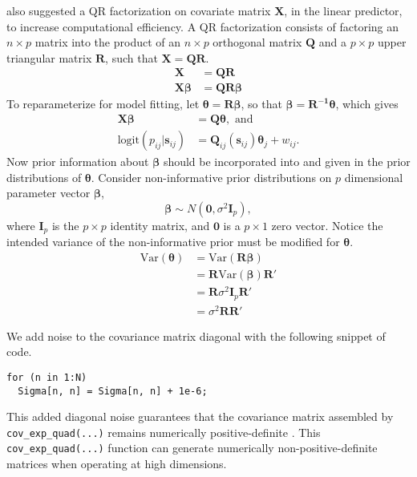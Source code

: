 \cite{Trangucci} also suggested a QR factorization on covariate matrix $\pmb{X}$, in the linear predictor, to increase computational efficiency. A QR factorization consists of factoring an $n \times p$ matrix into the product of an $n \times p$ orthogonal matrix $\pmb{Q}$ and a $p \times p$ upper triangular matrix $\pmb{R}$, such that $\pmb{X} = \pmb{QR}$. 
\begin{align}
\pmb{X} &= \pmb{QR} \\
\pmb{X \beta} &= \pmb{QR \beta}
\end{align}
To reparameterize for model fitting, let $\pmb{\theta} = \pmb{R \beta}$, so that $\pmb{\beta} = \pmb{R^{-1}\theta}$, which gives
\begin{align}
\pmb{X \beta} &= \pmb{Q \theta}, \text{ and } \\
\text{logit}(p_{ij}|\pmb{s}_{ij}) &= \pmb{Q}_{ij}(\pmb{s}_{ij}) \pmb{\theta}_{j} + w_{ij}.
\end{align}
Now prior information about $\pmb{\beta}$ should be incorporated into and given in the prior distributions of $\pmb{\theta}$. Consider non-informative prior distributions on $p$ dimensional parameter vector $\pmb{\beta}$,
$$ \pmb{\beta} \sim N(\pmb{0}, \sigma^{2}\pmb{I}_{p}), $$
where $\pmb{I}_{p}$ is the $p \times p$ identity matrix, and $\pmb{0}$ is a $p \times 1$ zero vector. Notice the intended variance of the non-informative prior must be modified for $\pmb{\theta}$.
\begin{align}
\text{Var}(\pmb{\theta}) &= \text{Var}(\pmb{R \beta}) \\
&= \pmb{R}\text{Var}(\pmb{\beta})\pmb{R}' \\
&= \pmb{R}\sigma^{2}\pmb{I}_{p}\pmb{R}' \\
&= \sigma^{2} \pmb{R}\pmb{R}'
\end{align}

We add noise to the covariance matrix diagonal with the following snippet of code.
\begin{verbatim}
for (n in 1:N)
  Sigma[n, n] = Sigma[n, n] + 1e-6;
\end{verbatim}
This added diagonal noise guarantees that the covariance matrix assembled by \verb|cov_exp_quad(...)| remains numerically positive-definite \cite{Trangucci2017}. This \verb|cov_exp_quad(...)| function can generate numerically non-positive-definite matrices when operating at high dimensions.


